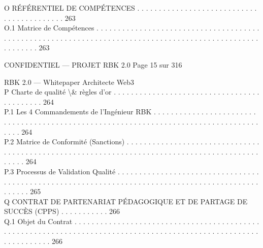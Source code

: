 \vspace{0.5em}
O     RÉFÉRENTIEL DE COMPÉTENCES . . . . . . . . . . . . . . . . . . . . . . . . . . . . . . . . . . . . . . . . . . 263\\
O.1     Matrice de Compétences . . . . . . . . . . . . . . . . . . . . . . . . . . . . . . . . . . . . . . . . . . . . . . . . . . . . . . . . . . . . . . . . . . . . . . . . . . . . . . . . . . . . . . . . . . . . . . . . . . . . . . . . . 263\\
\vspace{0.5em}
\vspace{0.5em}
\vspace{0.5em}
\begin{confidential}CONFIDENTIEL — PROJET RBK 2.0                                                                               Page 15 sur 316\end{confidential}
RBK 2.0 — Whitepaper Architecte Web3\\
\vspace{0.5em}
\vspace{0.5em}
P     Charte de qualité \textbackslash{}& règles d’or . . . . . . . . . . . . . . . . . . . . . . . . . . . . . . . . . . . . . . . . . . . 264\\
P.1     Les 4 Commandements de l’Ingénieur RBK . . . . . . . . . . . . . . . . . . . . . . . . . . . . . . . . . . . . . . . . . . . . . . . . . . . . . . . . . . . . . . . . . . . . . . . . . . . . . . . . . . . . . . . 264\\
P.2     Matrice de Conformité (Sanctions) . . . . . . . . . . . . . . . . . . . . . . . . . . . . . . . . . . . . . . . . . . . . . . . . . . . . . . . . . . . . . . . . . . . . . . . . . . . . . . . . . . . . . . . . . . . . . . . 264\\
P.3     Processus de Validation Qualité . . . . . . . . . . . . . . . . . . . . . . . . . . . . . . . . . . . . . . . . . . . . . . . . . . . . . . . . . . . . . . . . . . . . . . . . . . . . . . . . . . . . . . . . . . . . . . . . . . 265\\
\vspace{0.5em}
Q     CONTRAT DE PARTENARIAT PÉDAGOGIQUE ET DE PARTAGE DE SUCCÈS (CPPS) . . . . . . . . . . . 266\\
Q.1     Objet du Contrat . . . . . . . . . . . . . . . . . . . . . . . . . . . . . . . . . . . . . . . . . . . . . . . . . . . . . . . . . . . . . . . . . . . . . . . . . . . . . . . . . . . . . . . . . . . . . . . . . . . . . . . . . . . . . . . . . 266\\
